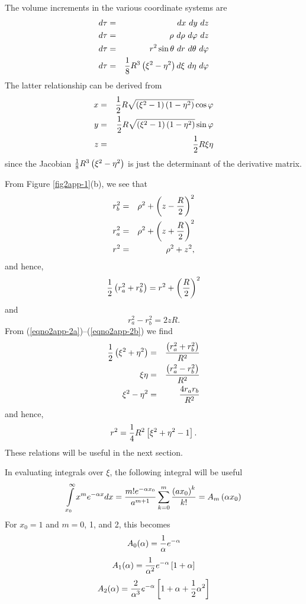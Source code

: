 The volume increments in the various coordinate systems are
\begin{eqnarray}
d \tau &=& dx\ dy\ dz\cr
d \tau &=& \rho\ d\rho\ d\varphi\ dz\cr
d \tau &=& r^2 \sin \theta\ dr\ d\theta\ d\varphi\cr
d \tau &=& {1 \over 8} R^3 \left( \xi^2 - \eta^2 \right) d\xi\ d\eta\ 
d\varphi
\label{eqno2app-3}
\end{eqnarray}
The latter relationship can be derived from
\begin{eqnarray*}
x &=& {1 \over 2} R \sqrt{\left( \xi^2 - 1 \right) \left( 1 - \eta^2 
\right)} \cos \varphi\cr
y &=& {1 \over 2} R \sqrt{\left( \xi^2 - 1 \right) \left( 1 - \eta^2 
\right)} \sin \varphi\cr
z &=& {1 \over 2} R \xi \eta\cr
\end{eqnarray*}
since the Jacobian ${1 \over 8} R^3 \left( \xi^2 - \eta^2 \right)$
is just the determinant of the derivative matrix.

From Figure \ref{fig2app-1}(b), we see that
\begin{eqnarray}
r^2_b &=& \rho^2 + \left( z - {R \over 2} \right)^2\cr
r^2_a &=& \rho^2 + \left( z + {R \over 2} \right)^2\cr
r^2 &=& \rho^2 + z^2,
\end{eqnarray}
and hence,
\begin{equation}
{1 \over 2} \left( r^2_a + r^2_b \right) = r^2 + \left( {R \over 2} 
\right)^2
\end{equation}
and
\begin{equation}
r^2_a - r^2_b = 2 z R.
\end{equation}
From (\ref{eqno2app-2a})--(\ref{eqno2app-2b}) we find
\begin{eqnarray}
{1 \over 2} \left( \xi^2 + \eta^2 \right) &=& {\left( r^2_a + r^2_b 
\right) \over R^2}\cr
\xi \eta &=& {\left( r^2_a - r^2_b \right) \over R^2}\cr
\xi^2 - \eta^2 &=& {4r_ar_b \over R^2}
\label{eqno2app-4}
\end{eqnarray}
and hence,
\begin{equation}
r^2 = {1 \over 4} R^2 \left[ \xi^2 + \eta^2 - 1 \right].
\label{eqno2app-5}
\end{equation}
These relations will be useful in the next section.

In evaluating integrals over $\xi$, the following integral will be useful
\begin{equation}
\int\limits^{\infty}_{x_0} x^m e^{- \alpha x} dx = {m!e^{- \alpha 
x_0} \over a^{m+1}} \sum^{m}_{k=0} {\left( ax_0 \right)^k \over k!} 
= A_m \left( \alpha x_0 \right)
\label{eqno2app-6}
\end{equation}
For $x_0 = 1$ and $m = 0$, 1, and 2, this becomes
\begin{equation}
A_0 ( \alpha ) = {1 \over \alpha} e^{- \alpha}
\label{eqno2app-7}
\end{equation}
\begin{equation}
A_1 ( \alpha ) = {1 \over \alpha^2} e^{- \alpha} \left[ 1 + \alpha 
\right]
\end{equation}
\begin{equation}
A_2 ( \alpha ) = {2 \over \alpha^3} e^{- \alpha}
\left[ 1 + \alpha + {1 \over 2} \alpha^2 \right]
\label{eqno2app-8}
\end{equation}

